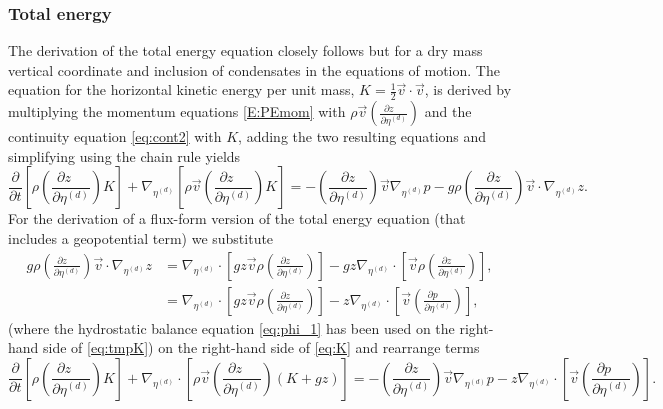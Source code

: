 \documentclass{agujournal}
\begin{document}
\subsubsection{Total energy}
The derivation of the total energy equation closely follows \citet{K1974MWR} but for a dry mass vertical coordinate and inclusion of condensates in the equations of motion. The equation for the horizontal kinetic energy per unit mass, $K=\frac{1}{2}\vec{v}\cdot \vec{v}$, is derived by multiplying the momentum equations \eqref{E:PEmom} with $\rho \vec{v} \left( \frac{\partial z\quad }{\partial \eta^{(d)}}\right)$ and the continuity equation \eqref{eq:cont2} with $K$, adding the two resulting equations and simplifying using the chain rule yields
\begin{equation}
\frac{\partial }{\partial t}\left[ \rho \left( \frac{\partial z\quad }{\partial \eta^{(d)}}\right)K\right]+\nabla_{\eta^{(d)}} \left[ \rho \vec{v} \left( \frac{\partial z\quad }{\partial \eta^{(d)}}\right)K\right]=-\left( \frac{\partial z}{\partial \eta^{(d)}}\right)\vec{v} \nabla_{\eta^{(d)}}p-g\rho \left( \frac{\partial z}{\partial \eta^{(d)}}\right)\vec{v} \cdot \nabla_{\eta^{(d)}}z.\label{eq:K}
\end{equation}
For the derivation of a flux-form version of the total energy equation (that includes a geopotential term) we substitute
\begin{align}
g \rho \left( \frac{\partial z\quad }{\partial \eta^{(d)}}\right) \vec{v} \cdot \nabla_{\eta^{(d)}} z &= \nabla_{\eta^{(d)}}\cdot \left[ gz\vec{v}\rho  \left( \frac{\partial z\quad }{\partial \eta^{(d)}}\right) \right] - gz \nabla_{\eta^{(d)}} \cdot \left[ \vec{v}\rho  \left( \frac{\partial z\quad }{\partial \eta^{(d)}}\right) \right],\\
&=\nabla_{\eta^{(d)}}\cdot \left[ g z\vec{v}\rho  \left( \frac{\partial z\quad }{\partial \eta^{(d)}}\right) \right] -z \nabla_{\eta^{(d)}}\cdot \left[ \vec{v} \left( \frac{\partial p\quad }{\partial \eta^{(d)}}\right)\right],\label{eq:tmpK}
\end{align}
(where the hydrostatic balance equation \eqref{eq:phi_1} has been used on the right-hand side of \eqref{eq:tmpK}) on the right-hand side of \eqref{eq:K} and rearrange terms
\begin{equation}
\frac{\partial }{\partial t}\left[ \rho \left( \frac{\partial z\quad }{\partial \eta^{(d)}}\right)K\right]+\nabla_{\eta^{(d)}} \cdot \left[ \rho \vec{v} \left( \frac{\partial z\quad }{\partial \eta^{(d)}}\right) \left( K+gz \right) \right]=-\left( \frac{\partial z}{\partial \eta^{(d)}}\right)\vec{v} \nabla_{\eta^{(d)}}p - z \nabla_{\eta^{(d)}}\cdot \left[ \vec{v} \left( \frac{\partial p\quad }{\partial \eta^{(d)}}\right)\right].\label{eq:tmp1}
\end{equation}
\end{document}
